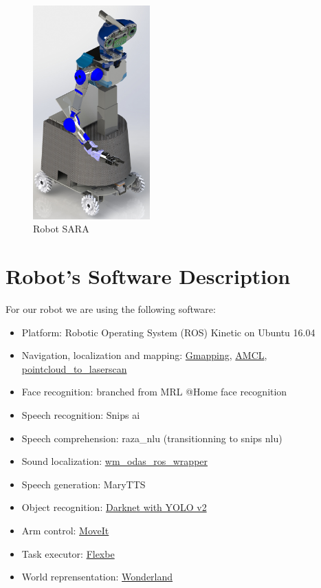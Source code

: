 \begin{figure}
	\centering
	\includegraphics[width=0.4\textwidth]{images/RenderISO2_2019.JPG}
	\caption{Robot SARA}
\end{figure}
\section*{Robot's Software Description}

For our robot we are using the following software:

\begin{itemize}
	\item Platform: Robotic Operating System (ROS) Kinetic on Ubuntu 16.04
	\item Navigation, localization and mapping: \href{http://wiki.ros.org/gmapping}{Gmapping}, \href{http://wiki.ros.org/amcl}{AMCL}, \href{http://wiki.ros.org/pointcloud_to_laserscan}{pointcloud\_to\_laserscan}
	\item Face recognition: branched from MRL @Home face recognition
	\item Speech recognition: Snips ai
	\item Speech comprehension: raza\_nlu (transitionning to snips nlu)
	\item Sound localization: \href{https://github.com/WalkingMachine/wm\_odas\_ros\_wrapper}{wm\_odas\_ros\_wrapper}
	\item Speech generation: MaryTTS
	\item Object recognition: \href{https://github.com/WalkingMachine/wm_darknet}{Darknet with YOLO v2 }
	\item Arm control: \href{http://wiki.ros.org/moveit}{MoveIt}
	\item Task executor: \href{http://wiki.ros.org/flexbe}{Flexbe} 
	\item World reprensentation: \href{http://github.com/walkingmachine/wonderland}{Wonderland}
\end{itemize}